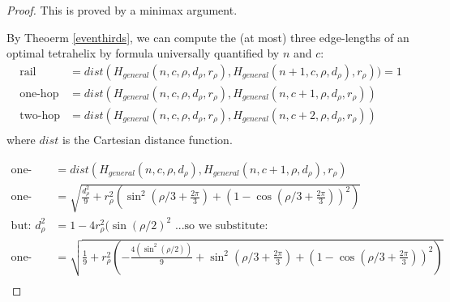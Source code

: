 \documentclass[11pt]{article}
\begin{document}
\begin{proof}
This is proved by a minimax argument.

By Theoerm \ref{eventhirds}, we can compute the (at most) three edge-lengths of an optimal
tetrahelix by formula universally quantified by $n$ and $c$:
\begin{align*}
  \text{rail} &= dist(H_{general}(n,c,\rho,d_{\rho},r_{\rho}),H_{general}(n+1,c,\rho,d_{\rho}),r_{\rho})) = 1 \\
  \text{one-hop} &= dist(H_{general}(n,c,\rho,d_{\rho},r_{\rho}),H_{general}(n,c+1,\rho,d_{\rho},r_{\rho}))  \\
  \text{two-hop} &= dist(H_{general}(n,c,\rho,d_{\rho},r_{\rho}),H_{general}(n,c+2,\rho,d_{\rho},r_{\rho}))  \\  
\end{align*}
where $dist$ is the Cartesian distance function.

\begin{align*}
  \text{one-hop} &= dist(H_{general}(n,c,\rho,d_{\rho}),H_{general}(n,c+1,\rho,d_{\rho}),r_{\rho})  \\
  \text{one-hop}  &= \sqrt{\frac{d_{\rho}^2}{9} + r_{\rho}^2(\sin^2(\rho/3 + \frac{2\pi}{3})  + (1 - \cos(\rho/3 + \frac{2\pi}{3}))^2)} \\
  \text{but: }  d_{\rho}^2 &= 1 - 4 r_{\rho}^2 (\sin( \rho / 2)^2 \text{ ...so we substitute:}\\
  \text{one-hop}  &= \sqrt{\frac{1}{9}  + r_{\rho}^2(-\frac{4 (\sin^2( \rho / 2))}{9} + \sin^2(\rho/3+ \frac{2\pi}{3})  + (1 - \cos(\rho/3 + \frac{2\pi}{3}))^2)} \\
\end{align*}


\end{proof}
\end{document}
